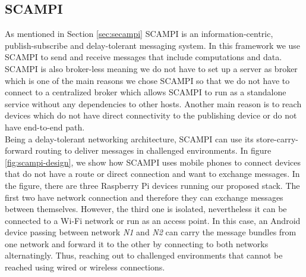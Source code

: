 \subsection{SCAMPI}
As mentioned in Section \ref{sec:secampi} SCAMPI is an information-centric, publish-subscribe and delay-tolerant messaging system. In this framework we use SCAMPI to send and receive messages that include computations and data. SCAMPI is also broker-less meaning we do not have to set up a server as broker which is one of the main reasons we chose SCAMPI  so that we do  not have to connect to a centralized broker which allows SCAMPI to run  as a standalone service without any dependencies to other hosts. Another main reason is to reach devices which do not have direct connectivity to the publishing device or do not have end-to-end path. \\

\noindent Being a delay-tolerant networking architecture, SCAMPI can use its store-carry-forward routing to deliver messages in challenged environments. In figure \ref{fig:scampi-design}, we show how SCAMPI uses mobile phones to connect devices that do not have a route or  direct connection and want to exchange messages. In the figure, there are three Raspberry Pi devices running our proposed stack. The first two  have network connection and therefore they can exchange messages between themselves. However, the third one is isolated, nevertheless it can be connected to a Wi-Fi network or run as an access point. In this case, an Android device passing  between network \textit{N1} and \textit{N2} can carry the message bundles from one network and forward it to the other by connecting to both networks alternatingly.  Thus, reaching out to challenged environments that cannot be reached using wired or wireless connections.


